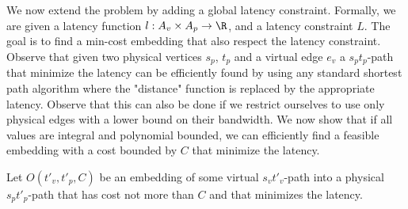 We now extend the problem by adding a global latency constraint.
Formally, we are given a latency function $l : A_v \times A_p \to \R$,
and a latency constraint $L$.
The goal is to find a min-cost embedding that also respect the latency
constraint.
Observe that given two physical vertices $s_p$, $t_p$ and a virtual edge $e_v$
a $s_pt_p$-path that minimize the latency can be efficiently found by using any
standard shortest path algorithm where the "distance" function is replaced by
the appropriate latency.
Observe that this can also be done if we restrict ourselves to use only physical
edges with a lower bound on their bandwidth.
We now show that if all values are integral and polynomial bounded, we can
efficiently find a feasible embedding with a cost bounded by $C$ that minimize
the latency.

Let $O(t'_v, t'_p, C)$ be an embedding of some virtual $s_vt'_v$-path 
into a physical $s_pt'_p$-path that has cost not more than $C$ and that
minimizes the latency.

